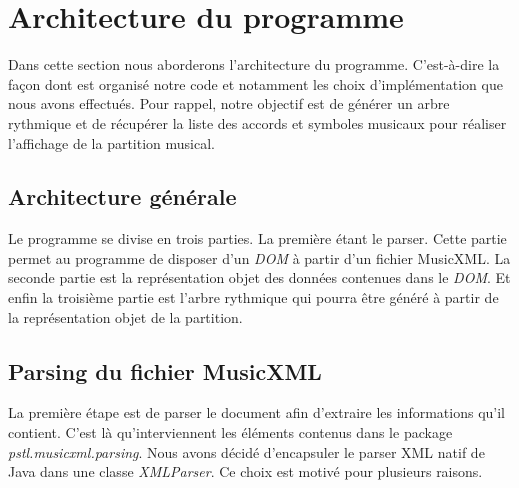 \section{Architecture du programme}

\par
Dans cette section nous aborderons l'architecture du programme. C'est-à-dire
la façon dont est organisé notre code et notamment les choix d’implémentation
que nous avons effectués. Pour rappel, notre objectif est de générer un arbre rythmique
et de récupérer la liste des accords et symboles musicaux pour réaliser l'affichage
de la partition musical.

\subsection{Architecture générale}

\par
Le programme se divise en trois parties. La première étant le parser. Cette partie
permet au programme de disposer d'un \emph{DOM} à partir d'un fichier MusicXML.
La seconde partie est la représentation objet des données contenues dans le \emph{DOM}.
Et enfin la troisième partie est l'arbre rythmique qui pourra être généré à partir
de la représentation objet de la partition.

\subsection{Parsing du fichier MusicXML}

\par
La première étape est de parser le document afin d'extraire les informations qu'il
contient. C'est là qu'interviennent les éléments contenus dans le package
\emph{pstl.musicxml.parsing}. Nous avons décidé d'encapsuler le parser XML natif
de Java dans une classe \emph{XMLParser}. Ce choix est motivé pour plusieurs raisons.

